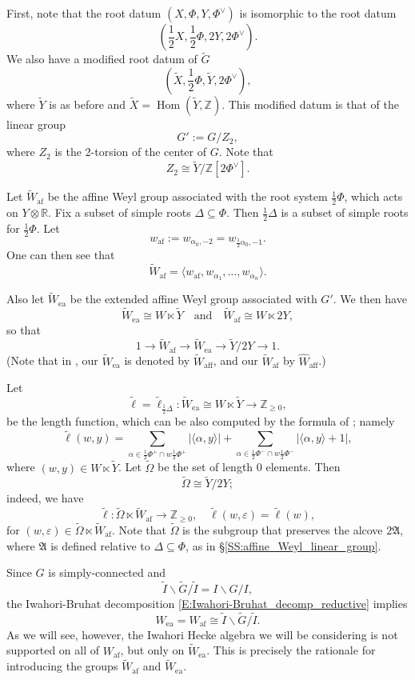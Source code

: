 \documentclass[10pt, letterpaper]{amsart}
\theoremstyle{plain}
\theoremstyle{definition}
\numberwithin{equation}{section}
\newcommand{\Z}{\mathbb{Z}}
\newcommand{\Gt}{\widetilde{G}}
\newcommand{\It}{\widetilde{I}}
\newcommand{\Xt}{\widetilde{X}}
\newcommand{\Yt}{\widetilde{Y}}
\newcommand{\Wt}{\widetilde{W}}
\newcommand{\Omegat}{\widetilde{\Omega}}
\newcommand{\Hom}{\operatorname{Hom}}
\newcommand{\aff}{\mathrm{aff}}
\newcommand{\af}{\mathrm{af}}
\newcommand{\ea}{\mathrm{ea}}
\newcommand{\la}{\langle}
\newcommand{\ra}{\rangle}
\newcommand{\qand}{{\quad\text{and}\quad}}
\begin{document}
First, note that the root datum $(X, \Phi, Y, \Phi^\vee)$ is isomorphic to the root datum
\[
(\frac{1}{2}X, \frac{1}{2}\Phi, 2Y, 2\Phi^\vee).
\]
We also have a modified root datum of $\Gt$ \cite{Mc12,W14}
\[
(\Xt, \frac{1}{2}\Phi, \Yt, 2\Phi^\vee),
\]
where $\Yt$ is as before and $\Xt=\Hom(\Yt,\mathbb{Z})$. This modified datum is that of the linear group
\[
G':=G\slash Z_2,
\]
where $Z_2$ is the 2-torsion of the center of $G$. Note that
\[
Z_2\cong \Yt\slash \Z[2\Phi^{\vee}].
\]

Let $\Wt_{\af}$ be the affine Weyl group associated with the root system $\frac{1}{2}\Phi$, which acts on $Y\otimes \mathbb{R}$. Fix a subset of simple roots $\Delta\subseteq \Phi$. Then $\frac{1}{2}\Delta $ is a subset of simple roots for $\frac{1}{2}\Phi$. Let
\begin{equation}\label{E:w_aff_definition}
    w_{\af}:=w_{\alpha_0, -2}=w_{\frac{1}{2}\alpha_{0},-1}.
\end{equation}
One can then see that
\[
\Wt_{\af}=\la w_{\af}, w_{\alpha_1}, \dots, w_{\alpha_n}\ra.
\]

Also let $\Wt_{\ea}$ be the extended affine Weyl group associated with $G'$. We then have
\[
\Wt_{\ea}\cong W\ltimes \Yt\qand \Wt_{\af}\cong W\ltimes 2Y,
\]
so that 
\[
1\longrightarrow \Wt_{\af}\longrightarrow \Wt_{\ea}\longrightarrow \Yt\slash 2Y\longrightarrow 1.
\]
(Note that in \cite{Karasiewicz}, our $\Wt_{\ea}$ is denoted by $\Wt_{\aff}$, and our $\Wt_{\af}$ by $\widehat{W}_{\aff}$.) 

Let 
\[
\tilde{\ell}=\tilde{\ell}_{\frac{1}{2}\Delta}:\Wt_{\ea}\cong W\ltimes \Yt\longrightarrow\Z_{\geq 0},
\]
be the length function, which can be also computed by the formula of \cite[Proposition 1.23]{IM}; namely
\[
\tilde{\ell}(w, y)=\sum_{\alpha\in\frac{1}{2}\Phi^+\cap w\frac{1}{2}\Phi^+}|\la\alpha, y\ra|+\sum_{\alpha\in\frac{1}{2}\Phi^-\cap w\frac{1}{2}\Phi^-}|\la\alpha, y\ra+1|,
\]
where $(w, y)\in W\ltimes\Yt$. Let $\Omegat$ be the set of length 0 elements. Then 
\[
\Omegat\cong \Yt\slash 2Y;
\]
indeed, we have
\[
\tilde{\ell}:\Omegat\ltimes \Wt_{\af}\longrightarrow\Z_{\geq 0},\quad \tilde{\ell}(w, \varepsilon)=\tilde{\ell}(w),
\]
for $(w, \varepsilon)\in \Omegat\ltimes \Wt_{\af}$. Note that $\Omegat$ is the subgroup that preserves the alcove $2\mathfrak{A}$, where $\mathfrak{A}$ is defined relative to $\Delta\subseteq\Phi$, as in \S \ref{SS:affine_Weyl_linear_group}.

Since $G$ is simply-connected and 
\[
\It\backslash\Gt\slash \It = I\backslash G\slash I,
\]
the Iwahori-Bruhat decomposition \eqref{E:Iwahori-Bruhat_decomp_reductive} implies
\[
W_{\ea}=W_{\af}\cong \It\backslash\Gt\slash \It.
\]
As we will see, however, the Iwahori Hecke algebra we will be considering is not supported on all of $W_{\af}$, but only on $\Wt_{\ea}$. This is precisely the rationale for introducing the groups $\Wt_{\af}$ and $\Wt_{\ea}$. 
\end{document}
